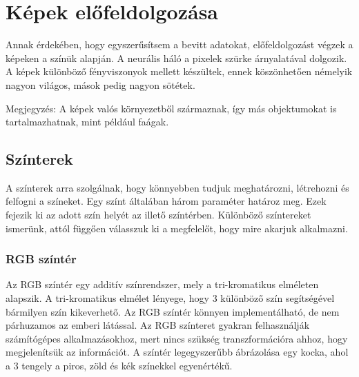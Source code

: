 \chapter{Képek előfeldolgozása}\label{ch:PREPROC}

Annak érdekében, hogy egyszerűsítsem a bevitt adatokat, előfeldolgozást végzek a képeken a színük alapján. A neurális háló a pixelek szürke árnyalatával dolgozik. 
A képek különböző fényviszonyok mellett készültek, ennek köszönhetően némelyik nagyon világos, mások pedig nagyon sötétek.

Megjegyzés: A képek valós környezetből származnak, így más objektumokat is tartalmazhatnak, mint például faágak.

\section{Színterek}\label{sec:PREPROC:colorSpaces}

A színterek arra szolgálnak, hogy könnyebben tudjuk meghatározni, létrehozni és felfogni a színeket. Egy színt általában három paraméter határoz meg. Ezek fejezik ki az adott szín helyét az illető színtérben. Különböző színtereket ismerünk, attól függően válasszuk ki a megfelelőt, hogy mire akarjuk alkalmazni. \citep{4}

\subsection{RGB színtér}\label{sec:PREPROC:rgb}

Az RGB színtér egy additív színrendszer, mely a tri-kromatikus elméleten alapszik. A tri-kromatikus elmélet lényege, hogy 3 különböző szín segítségével bármilyen szín kikeverhető.  
Az RGB színtér könnyen implementálható, de nem párhuzamos az emberi látással. Az RGB színteret gyakran felhasználják számítógépes alkalmazásokhoz, mert nincs szükség transzformációra ahhoz, hogy megjelenítsük az információt. A színtér legegyszerűbb ábrázolása egy kocka, ahol a 3 tengely a piros, zöld és kék színekkel egyenértékű. 

